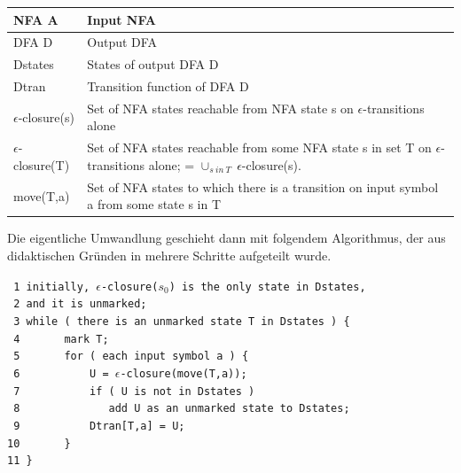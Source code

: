 \noindent
\begin{tabular}{|p{2.2cm}|p{9.0cm}|}
  \hline
  NFA A                 & Input NFA \\
  \hline
  DFA D                 & Output DFA \\
  \hline
  Dstates               & States of output DFA D \\
  \hline
  Dtran                 & Transition function of DFA D \\
  \hline
  $\epsilon$-closure(s) & Set of NFA states reachable from NFA state s
                          on $\epsilon$-transitions alone \\
  \hline
  $\epsilon$-closure(T) & Set of NFA states reachable from some NFA state s
                          in set T on $\epsilon$-transitions alone; =
                          $\cup_{s\ in\ T}\ \epsilon$-closure(s). \\
  \hline
  move(T,a)             & Set of NFA states to which there is a transition
                          on input symbol a from some state s in T \\
  \hline
\end{tabular}
\vspace{10pt}

Die eigentliche Umwandlung geschieht dann mit folgendem Algorithmus, der aus
didaktischen Gründen in mehrere Schritte aufgeteilt wurde.\vspace{10pt}

\noindent
\verb| 1 initially, |$\epsilon$\verb|-closure(|$s_0$\verb|) is the only state in Dstates,|\\
\verb| 2 and it is unmarked;|\\
\verb| 3 while ( there is an unmarked state T in Dstates ) {|\\
\verb| 4       mark T;|\\
\verb| 5       for ( each input symbol a ) {|\\
\verb| 6           U = |$\epsilon$\verb|-closure(move(T,a));|\\
\verb| 7           if ( U is not in Dstates )|\\
\verb| 8              add U as an unmarked state to Dstates;|\\
\verb| 9           Dtran[T,a] = U;|\\
\verb|10       }|\\
\verb|11 }|
\vspace{10pt}
